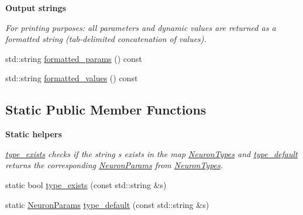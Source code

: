 \begin{Indent}\textbf{ Output strings}\par
{\em For printing purposes\+: all parameters and dynamic values are returned as a formatted string (tab-\/delimited concatenation of values). }\begin{DoxyCompactItemize}
\item 
std\+::string \hyperlink{classNeuron_a24dc0979745c7e25cfa997d88d973896}{formatted\+\_\+params} () const
\item 
std\+::string \hyperlink{classNeuron_aa1c46c99ed3e1a349b5e0ee82aec3026}{formatted\+\_\+values} () const
\end{DoxyCompactItemize}
\end{Indent}
\subsection*{Static Public Member Functions}
\begin{Indent}\textbf{ Static helpers}\par
{\em \hyperlink{classNeuron_a3a80c93e7cf5214b5e1a9925742bbe8e}{type\+\_\+exists} checks if the string {\ttfamily s} exists in the map \hyperlink{classNeuron_ab4b47274e756b72923d2f8a9a5037d23}{Neuron\+Types} and \hyperlink{classNeuron_a4e5c4e0a512460dd59449a0bec4d0db7}{type\+\_\+default} returns the corresponding \hyperlink{structNeuronParams}{Neuron\+Params} from \hyperlink{classNeuron_ab4b47274e756b72923d2f8a9a5037d23}{Neuron\+Types}. }\begin{DoxyCompactItemize}
\item 
static bool \hyperlink{classNeuron_a3a80c93e7cf5214b5e1a9925742bbe8e}{type\+\_\+exists} (const std\+::string \&s)
\item 
static \hyperlink{structNeuronParams}{Neuron\+Params} \hyperlink{classNeuron_a4e5c4e0a512460dd59449a0bec4d0db7}{type\+\_\+default} (const std\+::string \&s)
\end{DoxyCompactItemize}
\end{Indent}
